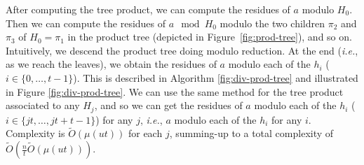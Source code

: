 \documentclass[11pt]{llncs}
\newcommand{\Oapp}{\ensuremath{\tilde{O}}}
\begin{document}
After computing the tree product, we can compute the residues of $a$ modulo $H_0$. 
Then we can compute the residues of $a \mod H_0$ modulo the two children $\pi_2$ and $\pi_3$ of $H_0 = \pi_1$ in the product tree (depicted in Figure~\ref{fig:prod-tree}), and so on. Intuitively, we descend the product tree doing modulo reduction. At the end ({\sl i.e.}, as we reach the leaves), we obtain the residues of $a$ modulo each of the $h_i$ ($i \in \{0,\dots,t-1\}$). This is described in Algorithm \ref{fig:div-prod-tree} and illustrated in Figure \ref{fig:div-prod-tree}. 
We can use the same method for the tree product associated to any $H_j$, and so we can get the residues of $a$ modulo each of the $h_i$ ($i \in \{jt,\dots,jt+t-1\}$) for any $j$, {\sl i.e.}, $a$ modulo each of the $h_i$ for any $i$.
Complexity is $\Oapp(\mu(u t))$ for each $j$, summing-up to a total complexity of $\Oapp(\frac{n}{t} \Oapp(\mu(u t)))$.
\end{document}
